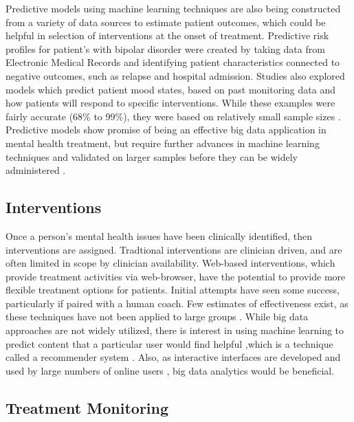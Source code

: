 \documentclass[sigconf]{acmart}
\begin{document}
Predictive models using machine learning techniques are also being constructed from a variety of data sources to estimate patient outcomes, which could be helpful in selection of interventions at the onset of treatment. \cite{bigdatabipolar} Predictive risk profiles for patient's with bipolar disorder were created by taking data from Electronic Medical Records and identifying patient characteristics connected to negative outcomes, such as relapse and hospital admission. Studies also explored models which predict patient mood states, based on past monitoring data and how patients will respond to specific interventions. While these examples were fairly accurate (68\% to 99\%), they were based on relatively small sample sizes \cite{machinelearnbipolar}.  Predictive models show promise of being an effective big data application in mental health treatment, but require further advances in machine learning techniques and validated on larger samples before they can be widely administered \cite{bigdatabipolar}.

\subsection{Interventions}

Once a person's mental health issues have been clinically identified, then interventions are assigned. Tradtional interventions are clinician driven, and are often limited in scope by clinician availability. Web-based interventions, which provide treatment activities via web-browser, have the potential to provide more flexible treatment options for patients. Initial attempts have seen some success, particularly if paired with a human coach. Few estimates of effectiveness exist, as these techniques have not been applied to large groups \cite{webtx}. While big data approaches are not widely utilized, there is interest in using machine learning to predict content that a particular user would find helpful \cite{bitreview},which is a technique called a recommender system \cite{recomdef}. Also, as interactive interfaces are developed and used by large numbers of online users \cite{webtx}, big data analytics would be beneficial. 

\subsection{Treatment Monitoring}
\end{document}
